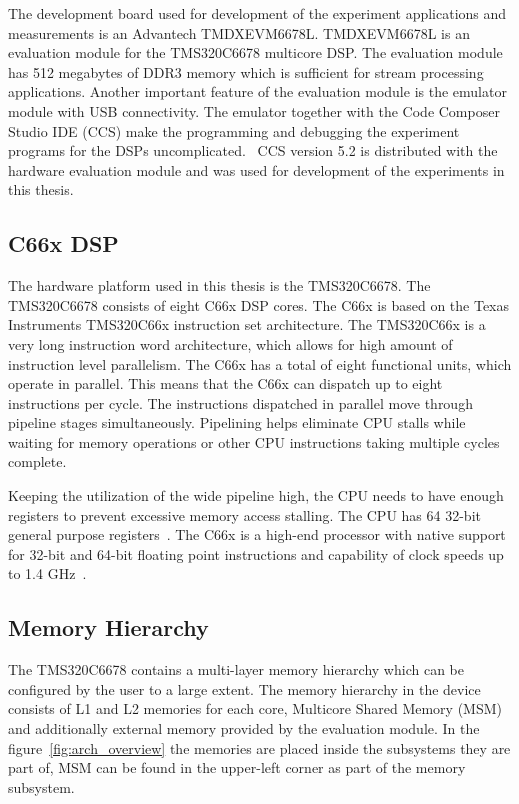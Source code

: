 The development board used for development of the experiment applications and measurements is an Advantech TMDXEVM6678L. TMDXEVM6678L is an evaluation module for the TMS320C6678 multicore DSP. The evaluation module has 512 megabytes of DDR3 memory which is sufficient for stream processing applications. Another important feature of the evaluation module is the emulator module with USB connectivity. The emulator together with the Code Composer Studio IDE (CCS) make the programming and debugging the experiment programs for the DSPs uncomplicated.~\cite{evmref} CCS version 5.2 is distributed with the hardware evaluation module and was used for development of the experiments in this thesis.

\subsection{C66x DSP}
\label{subsec:c66x}
The hardware platform used in this thesis is the TMS320C6678. The TMS320C6678 consists of eight C66x DSP cores. The C66x is based on the Texas Instruments TMS320C66x instruction set architecture. The TMS320C66x is a very long instruction word architecture, which allows for high amount of instruction level parallelism. The C66x has a total of eight functional units, which operate in parallel. This means that the C66x can dispatch up to eight instructions per cycle. The instructions dispatched in parallel move through pipeline stages simultaneously. Pipelining helps eliminate CPU stalls while waiting for memory operations or other CPU instructions taking multiple cycles complete.~\cite{sprugh7}

Keeping the utilization of the wide pipeline high, the CPU needs to have enough registers to prevent excessive memory access stalling. The CPU has 64 32-bit general purpose registers~\cite{sprugh7}. The C66x is a high-end processor with native support for 32-bit and 64-bit floating point instructions and capability of clock speeds up to 1.4 GHz~\cite{sprugh7}.

\subsection{Memory Hierarchy}
\label{subsec:c66memory}
The TMS320C6678 contains a multi-layer memory hierarchy which can be configured by the user to a large extent. The memory hierarchy in the device consists of L1 and L2 memories for each core, Multicore Shared Memory (MSM) and additionally external memory provided by the evaluation module. In the figure~\ref{fig:arch_overview} the memories are placed inside the subsystems they are part of, MSM can be found in the upper-left corner as part of the memory subsystem.

